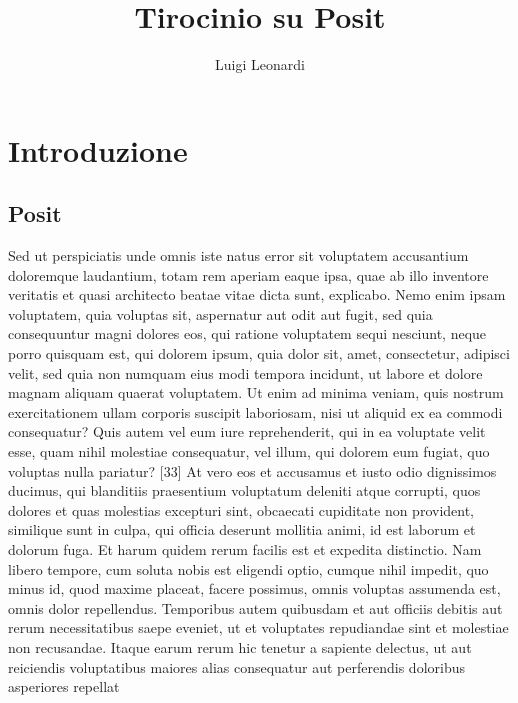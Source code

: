 \documentclass[a4paper,11pt]{article}
\author{Luigi Leonardi}
\title{Tirocinio su Posit}
\date{}
\begin{document}
	\maketitle
	\tableofcontents
	
	

\newpage
	\section{Introduzione}
	\subsection{Posit}

	Sed ut perspiciatis unde omnis iste natus error sit voluptatem accusantium doloremque laudantium, totam rem aperiam eaque ipsa, quae ab illo inventore veritatis et quasi architecto beatae vitae dicta sunt, explicabo. Nemo enim ipsam voluptatem, quia voluptas sit, aspernatur aut odit aut fugit, sed quia consequuntur magni dolores eos, qui ratione voluptatem sequi nesciunt, neque porro quisquam est, qui dolorem ipsum, quia dolor sit, amet, consectetur, adipisci velit, sed quia non numquam eius modi tempora incidunt, ut labore et dolore magnam aliquam quaerat voluptatem. Ut enim ad minima veniam, quis nostrum exercitationem ullam corporis suscipit laboriosam, nisi ut aliquid ex ea commodi consequatur? Quis autem vel eum iure reprehenderit, qui in ea voluptate velit esse, quam nihil molestiae consequatur, vel illum, qui dolorem eum fugiat, quo voluptas nulla pariatur? [33] At vero eos et accusamus et iusto odio dignissimos ducimus, qui blanditiis praesentium voluptatum deleniti atque corrupti, quos dolores et quas molestias excepturi sint, obcaecati cupiditate non provident, similique sunt in culpa, qui officia deserunt mollitia animi, id est laborum et dolorum fuga. Et harum quidem rerum facilis est et expedita distinctio. Nam libero tempore, cum soluta nobis est eligendi optio, cumque nihil impedit, quo minus id, quod maxime placeat, facere possimus, omnis voluptas assumenda est, omnis dolor repellendus. Temporibus autem quibusdam et aut officiis debitis aut rerum necessitatibus saepe eveniet, ut et voluptates repudiandae sint et molestiae non recusandae. Itaque earum rerum hic tenetur a sapiente delectus, ut aut reiciendis voluptatibus maiores alias consequatur aut perferendis doloribus asperiores repellat \cite{epfl1}
	



\newpage

	\nocite{articolo1}
	
	\printbibliography[title=Bibliografia]

	
\end{document}
